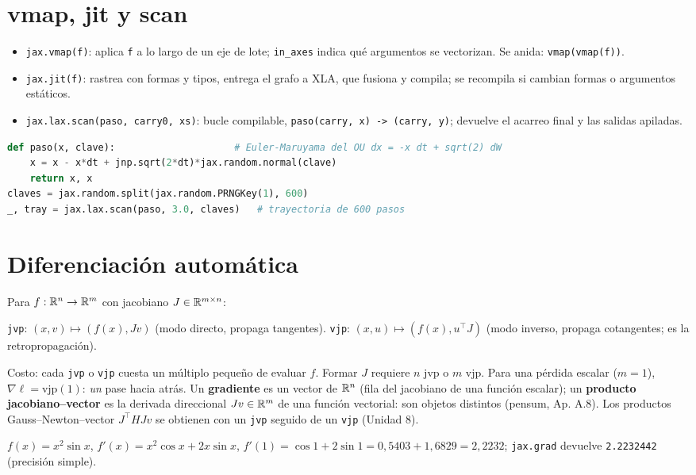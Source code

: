 \documentclass[11pt,a4paper]{article}
\begin{document}
\section{vmap, jit y scan}
\begin{itemize}[nosep]
\item \texttt{jax.vmap(f)}: aplica \texttt{f} a lo largo de un eje de lote; \texttt{in\_axes} indica qué argumentos se vectorizan. Se anida: \texttt{vmap(vmap(f))}.
\item \texttt{jax.jit(f)}: rastrea con formas y tipos, entrega el grafo a XLA, que fusiona y compila; se recompila si cambian formas o argumentos estáticos.
\item \texttt{jax.lax.scan(paso, carry0, xs)}: bucle compilable, \texttt{paso(carry, x) -> (carry, y)}; devuelve el acarreo final y las salidas apiladas.
\end{itemize}
\begin{lstlisting}[language=Python]
def paso(x, clave):                     # Euler-Maruyama del OU dx = -x dt + sqrt(2) dW
    x = x - x*dt + jnp.sqrt(2*dt)*jax.random.normal(clave)
    return x, x
claves = jax.random.split(jax.random.PRNGKey(1), 600)
_, tray = jax.lax.scan(paso, 3.0, claves)   # trayectoria de 600 pasos
\end{lstlisting}

\section{Diferenciación automática}
Para $f:\mathbb{R}^n\to\mathbb{R}^m$ con jacobiano $J\in\mathbb{R}^{m\times n}$:
\begin{definicion}
\texttt{jvp}: $(x,v)\mapsto(f(x),Jv)$ (modo directo, propaga tangentes). \texttt{vjp}: $(x,u)\mapsto(f(x),u^\top J)$
(modo inverso, propaga cotangentes; es la retropropagación).
\end{definicion}
Costo: cada \texttt{jvp} o \texttt{vjp} cuesta un múltiplo pequeño de evaluar $f$. Formar $J$ requiere $n$ jvp o $m$ vjp.
Para una pérdida escalar ($m=1$), $\nabla\ell=\text{vjp}(1)$: \emph{un} pase hacia atrás. Un \textbf{gradiente} es un
vector de $\mathbb{R}^n$ (fila del jacobiano de una función escalar); un \textbf{producto jacobiano--vector} es la derivada
direccional $Jv\in\mathbb{R}^m$ de una función vectorial: son objetos distintos (pensum, Ap. A.8). Los productos
Gauss--Newton--vector $J^\top HJv$ se obtienen con un \texttt{jvp} seguido de un \texttt{vjp} (Unidad 8).

\begin{ejemplo}
$f(x)=x^2\sin x$, $f'(x)=x^2\cos x+2x\sin x$, $f'(1)=\cos1+2\sin1=0{,}5403+1{,}6829=2{,}2232$;
\texttt{jax.grad} devuelve \texttt{2.2232442} (precisión simple).
\end{ejemplo}
\end{document}
